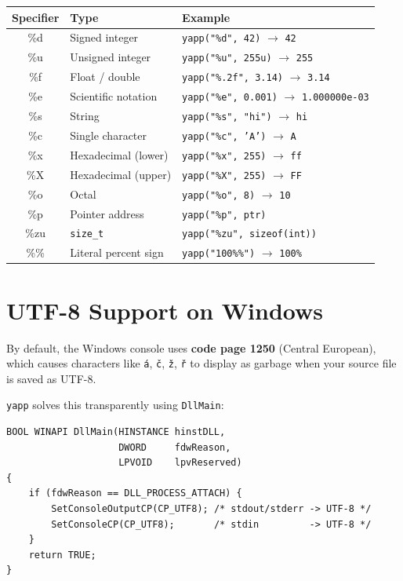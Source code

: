 \documentclass[11pt, a4paper]{article}
\begin{document}
\begin{center}
\begin{tabular}{>{\ttfamily}c l l}
\toprule
\normalfont\textbf{Specifier} & \textbf{Type} & \textbf{Example} \\
\midrule
\%d  & Signed integer        & \texttt{yapp("\%d", 42)} $\to$ \texttt{42} \\
\%u  & Unsigned integer      & \texttt{yapp("\%u", 255u)} $\to$ \texttt{255} \\
\%f  & Float / double        & \texttt{yapp("\%.2f", 3.14)} $\to$ \texttt{3.14} \\
\%e  & Scientific notation   & \texttt{yapp("\%e", 0.001)} $\to$ \texttt{1.000000e-03} \\
\%s  & String                & \texttt{yapp("\%s", "hi")} $\to$ \texttt{hi} \\
\%c  & Single character      & \texttt{yapp("\%c", 'A')} $\to$ \texttt{A} \\
\%x  & Hexadecimal (lower)   & \texttt{yapp("\%x", 255)} $\to$ \texttt{ff} \\
\%X  & Hexadecimal (upper)   & \texttt{yapp("\%X", 255)} $\to$ \texttt{FF} \\
\%o  & Octal                 & \texttt{yapp("\%o", 8)} $\to$ \texttt{10} \\
\%p  & Pointer address       & \texttt{yapp("\%p", ptr)} \\
\%zu & \texttt{size\_t}      & \texttt{yapp("\%zu", sizeof(int))} \\
\%\% & Literal percent sign  & \texttt{yapp("100\%\%")} $\to$ \texttt{100\%} \\
\bottomrule
\end{tabular}
\end{center}

\section{UTF-8 Support on Windows}

By default, the Windows console uses \textbf{code page 1250} (Central European), which
causes characters like \texttt{á}, \texttt{č}, \texttt{ž}, \texttt{ř} to display as garbage
when your source file is saved as UTF-8.

\texttt{yapp} solves this transparently using \texttt{DllMain}:

\begin{tcolorbox}[codebox]
\begin{lstlisting}
BOOL WINAPI DllMain(HINSTANCE hinstDLL,
                    DWORD     fdwReason,
                    LPVOID    lpvReserved)
{
    if (fdwReason == DLL_PROCESS_ATTACH) {
        SetConsoleOutputCP(CP_UTF8); /* stdout/stderr -> UTF-8 */
        SetConsoleCP(CP_UTF8);       /* stdin         -> UTF-8 */
    }
    return TRUE;
}
\end{lstlisting}
\end{tcolorbox}
\end{document}
